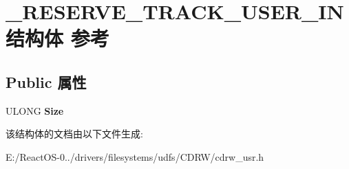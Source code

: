 \hypertarget{struct___r_e_s_e_r_v_e___t_r_a_c_k___u_s_e_r___i_n}{}\section{\+\_\+\+R\+E\+S\+E\+R\+V\+E\+\_\+\+T\+R\+A\+C\+K\+\_\+\+U\+S\+E\+R\+\_\+\+I\+N结构体 参考}
\label{struct___r_e_s_e_r_v_e___t_r_a_c_k___u_s_e_r___i_n}
\subsection*{Public 属性}
\begin{DoxyCompactItemize}
\item 
\mbox{\label{struct___r_e_s_e_r_v_e___t_r_a_c_k___u_s_e_r___i_n_af85002bc8439db732a0ddd34045fcb1b}} 
U\+L\+O\+NG {\bfseries Size}
\end{DoxyCompactItemize}


该结构体的文档由以下文件生成\+:\begin{DoxyCompactItemize}
\item 
E\+:/\+React\+O\+S-\/0../drivers/filesystems/udfs/\+C\+D\+R\+W/cdrw\+\_\+usr.\+h\end{DoxyCompactItemize}
